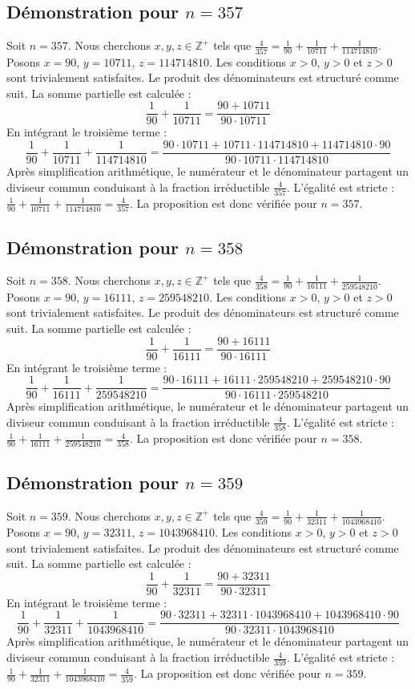 \documentclass[11pt,a4paper]{article}
\begin{document}
\subsection{Démonstration pour $n = 357$}
Soit $n = 357$. Nous cherchons $x, y, z \in \mathbb{Z}^{+}$ tels que $\frac{4}{357} = \frac{1}{90} + \frac{1}{10711} + \frac{1}{114714810}$.
Posons $x = 90$, $y = 10711$, $z = 114714810$.
Les conditions $x > 0$, $y > 0$ et $z > 0$ sont trivialement satisfaites.
Le produit des dénominateurs est structuré comme suit. La somme partielle est calculée :
$$ \frac{1}{90} + \frac{1}{10711} = \frac{90+10711}{90 \cdot 10711} $$
En intégrant le troisième terme :
$$ \frac{1}{90} + \frac{1}{10711} + \frac{1}{114714810} = \frac{90 \cdot 10711 + 10711 \cdot 114714810 + 114714810 \cdot 90}{90 \cdot 10711 \cdot 114714810} $$
Après simplification arithmétique, le numérateur et le dénominateur partagent un diviseur commun conduisant à la fraction irréductible $\frac{4}{357}$.
L'égalité est stricte : $\frac{1}{90} + \frac{1}{10711} + \frac{1}{114714810} = \frac{4}{357}$.
La proposition est donc vérifiée pour $n = 357$.
\subsection{Démonstration pour $n = 358$}
Soit $n = 358$. Nous cherchons $x, y, z \in \mathbb{Z}^{+}$ tels que $\frac{4}{358} = \frac{1}{90} + \frac{1}{16111} + \frac{1}{259548210}$.
Posons $x = 90$, $y = 16111$, $z = 259548210$.
Les conditions $x > 0$, $y > 0$ et $z > 0$ sont trivialement satisfaites.
Le produit des dénominateurs est structuré comme suit. La somme partielle est calculée :
$$ \frac{1}{90} + \frac{1}{16111} = \frac{90+16111}{90 \cdot 16111} $$
En intégrant le troisième terme :
$$ \frac{1}{90} + \frac{1}{16111} + \frac{1}{259548210} = \frac{90 \cdot 16111 + 16111 \cdot 259548210 + 259548210 \cdot 90}{90 \cdot 16111 \cdot 259548210} $$
Après simplification arithmétique, le numérateur et le dénominateur partagent un diviseur commun conduisant à la fraction irréductible $\frac{4}{358}$.
L'égalité est stricte : $\frac{1}{90} + \frac{1}{16111} + \frac{1}{259548210} = \frac{4}{358}$.
La proposition est donc vérifiée pour $n = 358$.
\subsection{Démonstration pour $n = 359$}
Soit $n = 359$. Nous cherchons $x, y, z \in \mathbb{Z}^{+}$ tels que $\frac{4}{359} = \frac{1}{90} + \frac{1}{32311} + \frac{1}{1043968410}$.
Posons $x = 90$, $y = 32311$, $z = 1043968410$.
Les conditions $x > 0$, $y > 0$ et $z > 0$ sont trivialement satisfaites.
Le produit des dénominateurs est structuré comme suit. La somme partielle est calculée :
$$ \frac{1}{90} + \frac{1}{32311} = \frac{90+32311}{90 \cdot 32311} $$
En intégrant le troisième terme :
$$ \frac{1}{90} + \frac{1}{32311} + \frac{1}{1043968410} = \frac{90 \cdot 32311 + 32311 \cdot 1043968410 + 1043968410 \cdot 90}{90 \cdot 32311 \cdot 1043968410} $$
Après simplification arithmétique, le numérateur et le dénominateur partagent un diviseur commun conduisant à la fraction irréductible $\frac{4}{359}$.
L'égalité est stricte : $\frac{1}{90} + \frac{1}{32311} + \frac{1}{1043968410} = \frac{4}{359}$.
La proposition est donc vérifiée pour $n = 359$.
\end{document}
